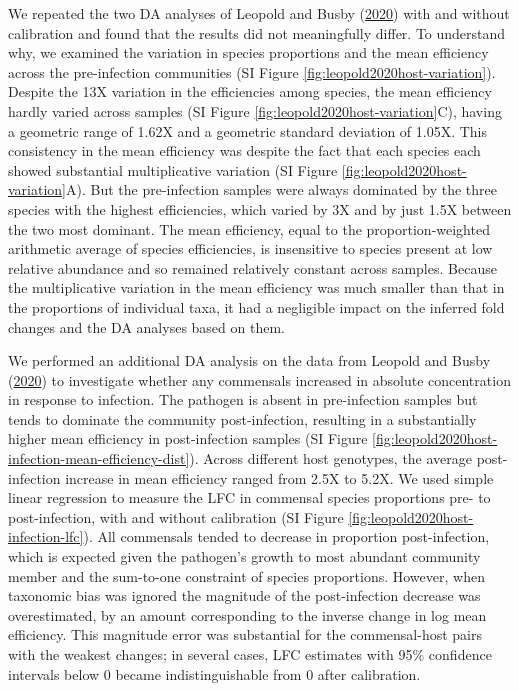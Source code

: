 \documentclass[
]{article}
\begin{document}
We repeated the two DA analyses of Leopold and Busby (\protect\hyperlink{ref-leopold2020host}{2020}) with and without calibration and found that the results did not meaningfully differ.
To understand why, we examined the variation in species proportions and the mean efficiency across the pre-infection communities (SI Figure \ref{fig:leopold2020host-variation}).
Despite the 13X variation in the efficiencies among species, the mean efficiency hardly varied across samples (SI Figure \ref{fig:leopold2020host-variation}C), having a geometric range of 1.62X and a geometric standard deviation of 1.05X.
This consistency in the mean efficiency was despite the fact that each species each showed substantial multiplicative variation (SI Figure \ref{fig:leopold2020host-variation}A).
But the pre-infection samples were always dominated by the three species with the highest efficiencies, which varied by 3X and by just 1.5X between the two most dominant.
The mean efficiency, equal to the proportion-weighted arithmetic average of species efficiencies, is insensitive to species present at low relative abundance and so remained relatively constant across samples.
Because the multiplicative variation in the mean efficiency was much smaller than that in the proportions of individual taxa, it had a negligible impact on the inferred fold changes and the DA analyses based on them.

We performed an additional DA analysis on the data from Leopold and Busby (\protect\hyperlink{ref-leopold2020host}{2020}) to investigate whether any commensals increased in absolute concentration in response to infection.
The pathogen is absent in pre-infection samples but tends to dominate the community post-infection, resulting in a substantially higher mean efficiency in post-infection samples (SI Figure \ref{fig:leopold2020host-infection-mean-efficiency-dist}).
Across different host genotypes, the average post-infection increase in mean efficiency ranged from 2.5X to 5.2X.
We used simple linear regression to measure the LFC in commensal species proportions pre- to post-infection, with and without calibration (SI Figure \ref{fig:leopold2020host-infection-lfc}).
All commensals tended to decrease in proportion post-infection, which is expected given the pathogen's growth to most abundant community member and the sum-to-one constraint of species proportions.
However, when taxonomic bias was ignored the magnitude of the post-infection decrease was overestimated, by an amount corresponding to the inverse change in log mean efficiency.
This magnitude error was substantial for the commensal-host pairs with the weakest changes; in several cases, LFC estimates with 95\% confidence intervals below 0 became indistinguishable from 0 after calibration.
\end{document}
